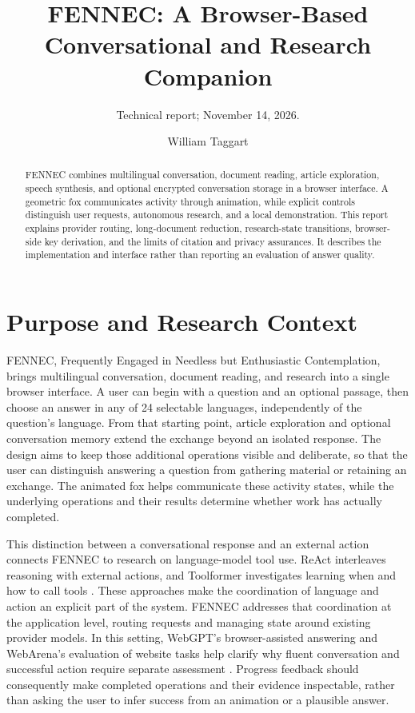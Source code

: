 \documentclass[manuscript,screen,nonacm]{acmart}
\title{FENNEC: A Browser-Based Conversational and Research Companion}
\subtitle{Technical report; November 14, 2026.}
\author{William Taggart}
\affiliation{\department{Modern and Classical Languages and Literatures}\institution{Virginia Tech}\city{Blacksburg}\state{Virginia}\country{USA}}
\begin{document}
\begin{abstract}
FENNEC combines multilingual conversation, document reading, article exploration, speech synthesis, and optional encrypted conversation storage in a browser interface. A geometric fox communicates activity through animation, while explicit controls distinguish user requests, autonomous research, and a local demonstration. This report explains provider routing, long-document reduction, research-state transitions, browser-side key derivation, and the limits of citation and privacy assurances. It describes the implementation and interface rather than reporting an evaluation of answer quality.
\end{abstract}
\maketitle
\section{Purpose and Research Context}

FENNEC, Frequently Engaged in Needless but Enthusiastic Contemplation, brings multilingual conversation, document reading, and research into a single browser interface. A user can begin with a question and an optional passage, then choose an answer in any of 24 selectable languages, independently of the question's language. From that starting point, article exploration and optional conversation memory extend the exchange beyond an isolated response. The design aims to keep those additional operations visible and deliberate, so that the user can distinguish answering a question from gathering material or retaining an exchange. The animated fox helps communicate these activity states, while the underlying operations and their results determine whether work has actually completed.

This distinction between a conversational response and an external action connects FENNEC to research on language-model tool use. ReAct interleaves reasoning with external actions, and Toolformer investigates learning when and how to call tools \cite{react,toolformer}. These approaches make the coordination of language and action an explicit part of the system. FENNEC addresses that coordination at the application level, routing requests and managing state around existing provider models. In this setting, WebGPT's browser-assisted answering and WebArena's evaluation of website tasks help clarify why fluent conversation and successful action require separate assessment \cite{webgpt,webarena}. Progress feedback should consequently make completed operations and their evidence inspectable, rather than asking the user to infer success from an animation or a plausible answer.
\end{document}
